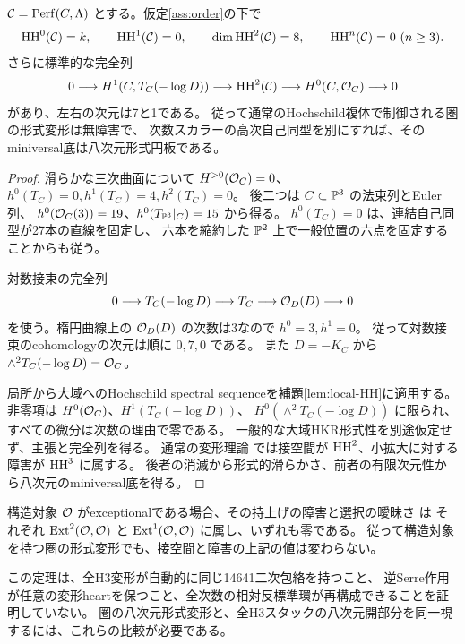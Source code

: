 \begin{theorem}[八次元の無障害な圏変形]\label{thm:HH8}
$\mathcal C=\operatorname{Perf}(C,\Lambda)$ とする。仮定\ref{ass:order}の下で
\[
\operatorname{HH}^0(\mathcal C)=k,\qquad \operatorname{HH}^1(\mathcal C)=0,\qquad
\dim\operatorname{HH}^2(\mathcal C)=8,\qquad \operatorname{HH}^n(\mathcal C)=0\ (n\ge3).
\]
さらに標準的な完全列
\[
0\longrightarrow H^1(C,T_C(-\log D))\longrightarrow\operatorname{HH}^2(\mathcal C)
\longrightarrow H^0(C,\mathcal O_C)\longrightarrow0
\]
があり、左右の次元は7と1である。
従って通常のHochschild複体で制御される圏の形式変形は無障害で、
次数スカラーの高次自己同型を別にすれば、そのminiversal底は八次元形式円板である。
\end{theorem}
\begin{proof}
滑らかな三次曲面について $H^{>0}(\mathcal O_C)=0$、
$h^0(T_C)=0,h^1(T_C)=4,h^2(T_C)=0$。
後二つは $C\subset\mathbb P^3$ の法束列とEuler列、
$h^0(\mathcal O_C(3))=19$、$h^0(T_{\mathbb P^3}|_C)=15$ から得る。
$h^0(T_C)=0$ は、連結自己同型が27本の直線を固定し、
六本を縮約した $\mathbb P^2$ 上で一般位置の六点を固定することからも従う。

対数接束の完全列
\[
0\longrightarrow T_C(-\log D)\longrightarrow T_C
\longrightarrow\mathcal O_D(D)\longrightarrow0
\]
を使う。楕円曲線上の $\mathcal O_D(D)$ の次数は3なので $h^0=3,h^1=0$。
従って対数接束のcohomologyの次元は順に $0,7,0$ である。
また $D=-K_C$ から $\wedge^2T_C(-\log D)=\mathcal O_C$。

局所から大域へのHochschild spectral sequenceを補題\ref{lem:local-HH}に適用する。
非零項は $H^0(\mathcal O_C)$、$H^1(T_C(-\log D))$、
$H^0(\wedge^2T_C(-\log D))$ に限られ、すべての微分は次数の理由で零である。
一般的な大域HKR形式性を別途仮定せず、主張と完全列を得る。
通常の変形理論 \cite{LVdB} では接空間が $\operatorname{HH}^2$、小拡大に対する障害が $\operatorname{HH}^3$ に属する。
後者の消滅から形式的滑らかさ、前者の有限次元性から八次元のminiversal底を得る。
\end{proof}

\begin{corollary}
構造対象 $\mathcal O$ がexceptionalである場合、その持上げの障害と選択の曖昧さ \cite{LowenObject} は
それぞれ $\operatorname{Ext}^2(\mathcal O,\mathcal O)$ と $\operatorname{Ext}^1(\mathcal O,\mathcal O)$ に属し、いずれも零である。
従って構造対象を持つ圏の形式変形でも、接空間と障害の上記の値は変わらない。
\end{corollary}

\begin{remark}
この定理は、全H3変形が自動的に同じ14641二次包絡を持つこと、
逆Serre作用が任意の変形heartを保つこと、全次数の相対反標準環が再構成できることを証明していない。
圏の八次元形式変形と、全H3スタックの八次元開部分を同一視するには、これらの比較が必要である。
\end{remark}

